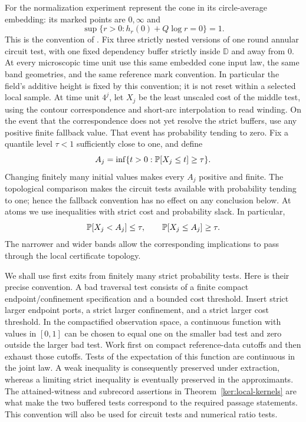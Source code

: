 For the normalization experiment represent the cone in its
circle-average embedding: its marked points are $0,\infty$ and
\[
 \sup\{r>0:h_r(0)+Q\log r=0\}=1.
\]
This is the convention of \cite[Definition~4.10]{DMSMating}.
Fix three strictly nested versions of one round annular circuit test,
with one fixed dependency buffer strictly inside $\mathbb D$ and
away from $0$.  At every microscopic time unit use this same embedded
cone input law, the same band geometries, and the same reference
mark convention.  In particular the field's additive height is fixed
by this convention; it is not reset within a selected local sample.
At time unit $4^j$, let $X_j$ be the least unscaled cost of the
middle test, using the contour correspondence and short-arc
interpolation to read winding.  On the event that the correspondence
does not yet resolve the strict buffers, use any positive finite
fallback value.  That event has probability tending to zero.  Fix a
quantile level $\tau<1$ sufficiently close to one, and define
\begin{equation}
 A_j=\inf\{t>0:\PP[X_j\leq t]\geq\tau\}.
 \label{met:quantile}
\end{equation}
Changing finitely many initial values makes every $A_j$ positive and
finite.  The topological comparison makes the circuit tests available
with probability tending to one; hence the fallback convention has no
effect on any conclusion below.  At atoms we use inequalities with
strict cost and probability slack.  In particular,
\[
 \mathbb P[X_j<A_j]\leq\tau,\qquad
 \mathbb P[X_j\leq A_j]\geq\tau.
\]
The narrower and wider bands allow the corresponding implications to
pass through the local certificate topology.

We shall use first exits from finitely many strict probability tests.
Here is their precise convention.  A bad traversal test consists of a
finite compact endpoint/confinement specification and a bounded cost
threshold.  Insert strict larger endpoint ports, a strict larger
confinement, and a strict larger cost threshold.  In the compactified
observation space, a continuous function with values in $[0,1]$ can be
chosen to equal one on the smaller bad test and zero outside the larger
bad test.  Work first on compact reference-data cutoffs and then
exhaust those cutoffs.  Tests of the expectation of this function are
continuous in the joint law.  A weak inequality is consequently
preserved under extraction, whereas a limiting strict inequality is
eventually preserved in the approximants.  The attained-witness and
subrecord assertions in Theorem~\ref{ker:local-kernels} are what make
the two buffered tests correspond to the required passage statements.
This convention will also be used for circuit tests and numerical
ratio tests.

